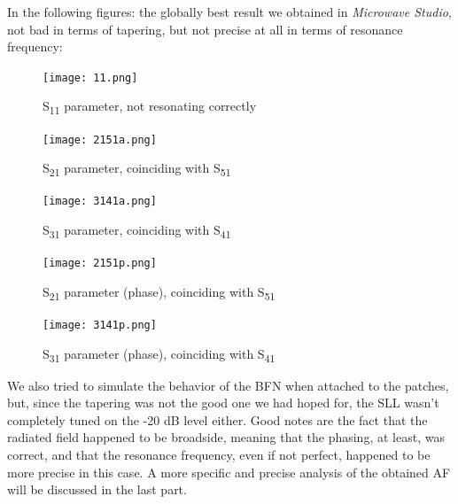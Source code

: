 \par\medskip
\noindent

In the following figures: the globally best result we obtained in \textit{Microwave Studio}, not bad in terms of tapering, but not precise at all in terms of resonance frequency:

\begin{figure}[H]
\centering
\texttt{[image: 11.png]}
\caption{S\textsubscript{11} parameter, not resonating correctly}
\label{a}
\end{figure}

\begin{figure}[H]
\centering
\texttt{[image: 2151a.png]}
\caption{S\textsubscript{21} parameter, coinciding with S\textsubscript{51}}
\label{a}
\end{figure}

\begin{figure}[H]
\centering
\texttt{[image: 3141a.png]}
\caption{S\textsubscript{31} parameter, coinciding with S\textsubscript{41}}
\label{b}
\end{figure}

\begin{figure}[H]
\centering
\texttt{[image: 2151p.png]}
\caption{S\textsubscript{21} parameter (phase), coinciding with S\textsubscript{51}}
\label{c}
\end{figure}

\begin{figure}[H]
\centering
\texttt{[image: 3141p.png]}
\caption{S\textsubscript{31} parameter (phase), coinciding with S\textsubscript{41}}
\label{d}
\end{figure}

\par\medskip
\noindent
We also tried to simulate the behavior of the BFN when attached to the patches, but, since the tapering was not the good one we had hoped for, the SLL wasn't completely tuned on the -20 dB level either. Good notes are the fact that the radiated field happened to be broadside, meaning that the phasing, at least, was correct, and that the resonance frequency, even if not perfect, happened to be more precise in this case. A more specific and precise analysis of the obtained AF will be discussed in the last part.